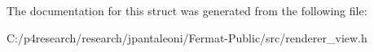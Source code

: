 The documentation for this struct was generated from the following file\+:\begin{DoxyCompactItemize}
\item 
C\+:/p4research/research/jpantaleoni/\+Fermat-\/\+Public/src/renderer\+\_\+view.\+h\end{DoxyCompactItemize}
